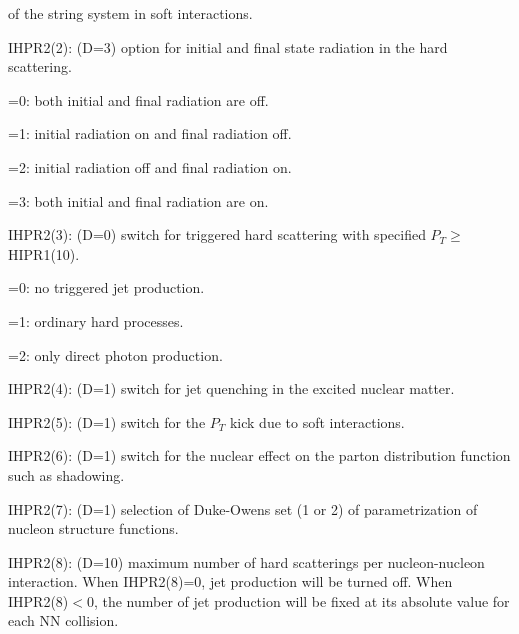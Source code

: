 \begin{description}
                of the string system in soft interactions. 
\item{}IHPR2(2): (D=3) option for initial and final state radiation in 
                the hard scattering.
        \vspace{-12.0pt}
        \begin{description}
        \itemsep=-4.0pt
                \item{}=0: both initial and final radiation are off.
                \item{}=1: initial radiation on and final radiation off.
                \item{}=2: initial radiation off and final radiation on.
                \item{}=3: both initial and final radiation are on.
        \end{description}
        \vspace{-4.0pt}
\item{}IHPR2(3): (D=0) switch for triggered hard scattering with specified
                $P_T\geq$HIPR1(10).
        \vspace{-12.0pt}
        \begin{description}
        \itemsep=-4.0pt
                \item{}=0: no triggered jet production. 
                \item{}=1: ordinary hard processes.
                \item{}=2: only direct photon production.
        \end{description}
        \vspace{-4.0pt}
\item{}IHPR2(4): (D=1) switch for jet quenching in the excited 
                nuclear matter.
\item{}IHPR2(5): (D=1) switch for the $P_T$ kick due to soft interactions. 
\item{}IHPR2(6): (D=1) switch for the nuclear effect on the parton 
                distribution function such as shadowing.
\item{}IHPR2(7): (D=1) selection of Duke-Owens set (1 or 2) of parametrization 
                of nucleon structure functions.
\item{}IHPR2(8): (D=10) maximum number of hard scatterings per 
                nucleon-nucleon interaction. When IHPR2(8)=0, jet
                production will be turned off. When IHPR2(8)$<0$, the
                number of jet production will be fixed at its absolute
                value for each NN collision.

\end{description}
